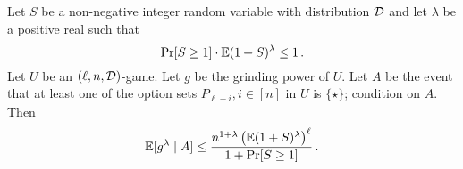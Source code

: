     \begin{lemma}\label{lemma:xorgame-moment}
        Let $S$ be a non-negative integer random variable with distribution $\mathcal{D}$ 
        and let $\lambda$ be a positive real such that 
        \begin{equation}\label{eq:lambda-S-requirement}
            \Pr[S \geq 1] \cdot \operatorname{\mathbb{E}} (1 + S)^\lambda \leq 1  
            \,.
        \end{equation}
        Let $U$ be an $(\ell, n, \mathcal{D})$-game.
        Let $g$ be the grinding power of $U$. 
        Let $A$ be the event that 
        at least one of the option sets $P_{\ell + i}, i \in [n]$ in $U$ is $\{\star\}$; 
        condition on $A$.
        Then 
        $$
            \operatorname{\mathbb{E}}[g^\lambda \mid A] \leq 
                \frac{n^{1 + \lambda} \left(\operatorname{\mathbb{E}} (1 + S)^\lambda\right)^{\ell}}{1 + \Pr[S \geq 1]}            
                \,.
        $$
    \end{lemma}

